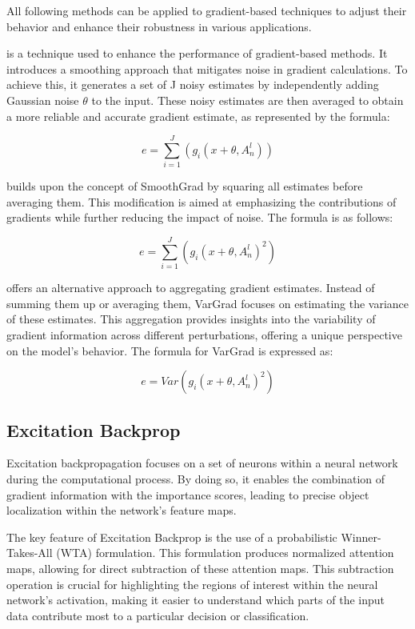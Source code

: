 All following methods can be applied to gradient-based techniques to adjust their behavior and enhance their robustness in various applications.

 \cite{smilkov2017smoothgrad} is a technique used to enhance the performance of gradient-based methods. It introduces a smoothing approach that mitigates noise in gradient calculations. To achieve this, it generates a set of J noisy estimates by independently adding Gaussian noise $\theta$ to the input. These noisy estimates are then averaged to obtain a more reliable and accurate gradient estimate, as represented by the formula:

$$ e = \sum_{i=1}^{J} (g_i(x+\theta,A^l_n))$$

 \cite{hooker2019benchmark} builds upon the concept of SmoothGrad by squaring all estimates before averaging them. This modification is aimed at emphasizing the contributions of gradients while further reducing the impact of noise. The formula is as follows:

$$ e = \sum_{i=1}^{J} (g_i(x+\theta,A^l_n)^2)$$


 \cite{adebayo2020sanity} offers an alternative approach to aggregating gradient estimates. Instead of summing them up or averaging them, VarGrad focuses on estimating the variance of these estimates. This aggregation provides insights into the variability of gradient information across different perturbations, offering a unique perspective on the model's behavior. The formula for VarGrad is expressed as:

$$ e = Var(g_i(x+\theta,A^l_n)^2)$$



\subsection{Excitation Backprop \cite{zhang2018}}


Excitation backpropagation focuses on a set of neurons within a neural network during the computational process. By doing so, it enables the combination of gradient information with the importance scores, leading to precise object localization within the network's feature maps.

The key feature of Excitation Backprop is the use of a probabilistic Winner-Takes-All (WTA) formulation. This formulation produces normalized attention maps, allowing for direct subtraction of these attention maps. This subtraction operation is crucial for highlighting the regions of interest within the neural network's activation, making it easier to understand which parts of the input data contribute most to a particular decision or classification.

